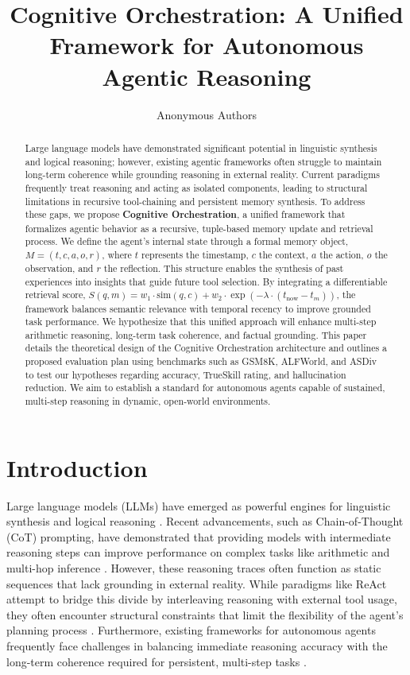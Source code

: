 \documentclass[11pt,a4paper]{article}
\title{Cognitive Orchestration: A Unified Framework for Autonomous Agentic Reasoning}
\author{Anonymous Authors}
\date{}
\begin{document}
\maketitle

\begin{abstract}
Large language models have demonstrated significant potential in linguistic synthesis and logical reasoning; however, existing agentic frameworks often struggle to maintain long-term coherence while grounding reasoning in external reality. Current paradigms frequently treat reasoning and acting as isolated components, leading to structural limitations in recursive tool-chaining and persistent memory synthesis. To address these gaps, we propose \textbf{Cognitive Orchestration}, a unified framework that formalizes agentic behavior as a recursive, tuple-based memory update and retrieval process. We define the agent's internal state through a formal memory object, $M = (t, c, a, o, r)$, where $t$ represents the timestamp, $c$ the context, $a$ the action, $o$ the observation, and $r$ the reflection. This structure enables the synthesis of past experiences into insights that guide future tool selection. By integrating a differentiable retrieval score, $S(q, m) = w_1 \cdot \text{sim}(q, c) + w_2 \cdot \exp(-\lambda \cdot (t_{\text{now}} - t_m))$, the framework balances semantic relevance with temporal recency to improve grounded task performance. We hypothesize that this unified approach will enhance multi-step arithmetic reasoning, long-term task coherence, and factual grounding. This paper details the theoretical design of the Cognitive Orchestration architecture and outlines a proposed evaluation plan using benchmarks such as GSM8K, ALFWorld, and ASDiv to test our hypotheses regarding accuracy, TrueSkill rating, and hallucination reduction. We aim to establish a standard for autonomous agents capable of sustained, multi-step reasoning in dynamic, open-world environments.

\end{abstract}

\section{Introduction}
Large language models (LLMs) have emerged as powerful engines for linguistic synthesis and logical reasoning \cite{vaswani2017}. Recent advancements, such as Chain-of-Thought (CoT) prompting, have demonstrated that providing models with intermediate reasoning steps can improve performance on complex tasks like arithmetic and multi-hop inference \cite{wei2022}. However, these reasoning traces often function as static sequences that lack grounding in external reality. While paradigms like ReAct attempt to bridge this divide by interleaving reasoning with external tool usage, they often encounter structural constraints that limit the flexibility of the agent's planning process \cite{yao2023}. Furthermore, existing frameworks for autonomous agents frequently face challenges in balancing immediate reasoning accuracy with the long-term coherence required for persistent, multi-step tasks \cite{park2023}.
\end{document}
